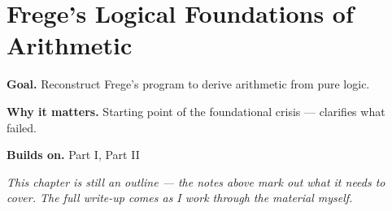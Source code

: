 \chapter{Frege's Logical Foundations of Arithmetic}
\label{ch:14-metamathematics-01}

\begin{chapterintro}
\textbf{Goal.} Reconstruct Frege's program to derive arithmetic from pure logic.

\textbf{Why it matters.} Starting point of the foundational crisis — clarifies what failed.

\textbf{Builds on.} Part I, Part II
\end{chapterintro}

\textit{This chapter is still an outline --- the notes above mark out what it needs to cover. The full write-up comes as I work through the material myself.}
